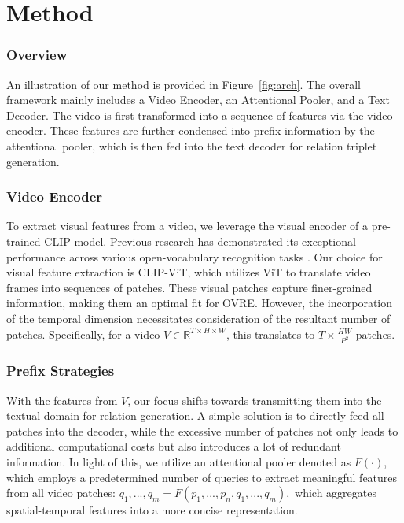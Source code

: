\documentclass[letterpaper]{article}
\begin{document}
\section{Method}
\subsubsection{Overview}
An illustration of our method is provided in Figure~\ref{fig:arch}. The overall framework mainly includes a Video Encoder, an Attentional Pooler, and a Text Decoder.
The video is first transformed into a sequence of features via the video encoder.
These features are further condensed into prefix information by the attentional pooler, which is then fed into the text decoder for relation triplet generation.

\subsubsection{Video Encoder}
To extract visual features from a video, we leverage the visual encoder of a pre-trained CLIP \cite{radford2021learning} model.
Previous research has demonstrated its exceptional performance across various open-vocabulary recognition tasks \cite{ni2022expanding,tang2021clip4caption,luo2022clip4clip}.
Our choice for visual feature extraction is CLIP-ViT, which utilizes ViT\cite{dosovitskiy2020image} to translate video frames into sequences of patches. These visual patches capture finer-grained information, making them an optimal fit for OVRE. However, the incorporation of the temporal dimension necessitates consideration of the resultant number of patches. Specifically, for a video $V\in \mathbb{R}^{T\times H\times W}$, this translates to $T\times\frac{HW}{P^{2}}$ patches.
\subsubsection{Prefix Strategies}
With the features from $V$, our focus shifts towards transmitting them into the textual domain for relation generation. A simple solution is to directly feed all patches into the decoder, while the excessive number of patches not only leads to additional computational costs but also introduces a lot of redundant information.
In light of this, we utilize an attentional pooler denoted as $F(\cdot)$, which employs a predetermined number of queries to extract meaningful features from all video patches:
$
q_1,...,q_m=F(p_1,...,p_n,q_1,...,q_m),
$
which aggregates spatial-temporal features into a more concise representation.
\end{document}

